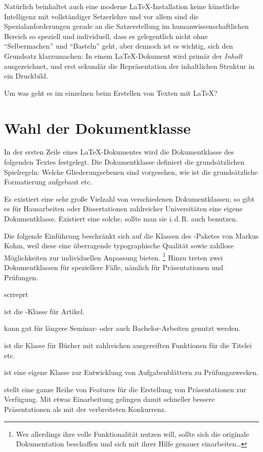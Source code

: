 Natürlich beinhaltet auch eine moderne \LaTeX -Installation keine künstliche Intelligenz mit 
vollständiger Setzerlehre und vor allem sind die Spezialanforderungen gerade an die Satzerstellung im
humanwissenschaftlichen Bereich so speziell und individuell, dass es gelegentlich nicht ohne 
\enquote{Selbermachen} und \enquote{Basteln} geht, aber dennoch ist es wichtig, sich den Grundsatz
klarzumachen: In einem \LaTeX -Dokument wird primär der \emph{Inhalt} ausgezeichnet, und erst sekundär
die Repräsentation der inhaltlichen Struktur in ein Druckbild.

Um was geht es im einzelnen beim Erstellen von Texten mit \LaTeX ? 


\section{Wahl der Dokumentklasse}

In der ersten Zeile eines \LaTeX -Dokumentes wird die Dokumentklasse des folgenden Textes 
festgelegt. Die Dokumentklasse definiert die grundsätzlichen Spielregeln:
Welche Gliederungsebenen sind vorgesehen, wie ist die grundsätzliche Formatierung aufgebaut etc.

Es existiert eine sehr große Vielzahl von verschiedenen Dokumentklassen;
so gibt es für Hausarbeiten oder Dissertationen zahlreicher Universitäten eine eigene
Dokumentklasse. Existiert eine solche, sollte man sie i.\,d.\,R. auch benutzen.

Die folgende Einführung beschränkt sich auf die Klassen des \KOMAScript-Paketes von
Markus Kohm, weil diese eine überragende typographische Qualität sowie zahllose Möglichkeiten
zur individuellen Anpassung bieten.%
\footnote{Wer allerdings ihre volle Funktionalität nutzen will, sollte sich die originale 
Dokumentation beschaffen und sich mit ihrer Hilfe genauer einarbeiten\dots}
Hinzu treten zwei Dokumentklassen für speziellere Fälle, nämlich für Präsentationen und 
Prüfungen.

\begin{labeling}{scrreprt}
 \item[scrartcl] ist die \KOMAScript-Klasse für Artikel.
 \item[scrreprt] kann gut für längere Seminar- oder auch Bachelor-Arbeiten genutzt werden.
 \item[scrbook] ist die Klasse für Bücher mit zahlreichen ausgereiften Funktionen für
  die Titelei etc.
 \item[exam] ist eine eigene Klasse zur Entwicklung von Aufgabenblättern zu Prüfungszwecken.
 \item[beamer] stellt eine ganze Reihe von Features für die Erstellung von Präsentationen
  zur Verfügung. Mit etwas Einarbeitung gelingen damit schneller bessere Präsentationen als 
  mit der verbreiteten Konkurrenz.
\end{labeling}


